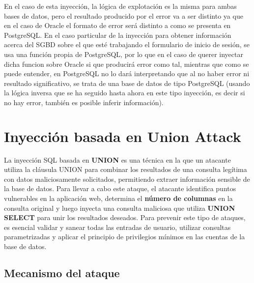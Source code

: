 \documentclass[a4paper,12pt]{article}
\begin{document}
En el caso de esta inyección, la lógica de explotación es la misma para ambas bases de datos, pero el resultado producido por el error va a ser distinto
ya que en el caso de Oracle el formato de error será distinto a como se presenta en PostgreSQL. En el caso particular de la inyección 
para obtener información acerca del SGBD sobre el que esté trabajando el formulario de inicio de sesión, se usa una función propia de PostgreSQL,
por lo que en el caso de querer inyectar dicha funcion sobre Oracle si que producirá error como tal, mientras que como se puede entender,
en PostgreSQL no lo dará interpretando que al no haber error ni resultado significativo, se trata de una base de datos de tipo PostgreSQL 
(usando la lógica inversa que se ha seguido hasta ahora en este tipo inyección, es decir si no hay error, también es posible inferir información).


\section{Inyección basada en Union Attack}
La inyección SQL basada en \textbf{UNION} es una técnica en la que un atacante utiliza la cláusula UNION para combinar los resultados de una consulta legítima con datos maliciosamente solicitados, permitiendo extraer información sensible de la base de datos. 
Para llevar a cabo este ataque, el atacante identifica puntos vulnerables en la aplicación web, determina el \textbf{número de columnas} en la consulta original y luego inyecta una consulta maliciosa que utiliza \textbf{UNION SELECT} para unir los resultados deseados. 
Para prevenir este tipo de ataques, es esencial validar y sanear todas las entradas de usuario, utilizar consultas parametrizadas y aplicar el principio de privilegios mínimos en las cuentas de la base de datos.

\subsection{Mecanismo del ataque}
\end{document}

